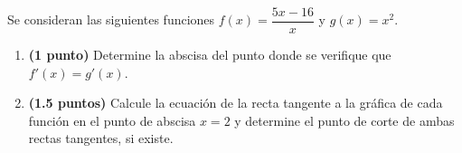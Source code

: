 
Se consideran las siguientes funciones $f(x)=\dfrac{5x-16}{x}$ y $g(x)=x^2$.
\begin{enumerate}[label=\alph*)]
\item \textbf{(1 punto)} Determine la abscisa del punto donde se verifique que $f'(x)=g'(x)$.
\item \textbf{(1.5 puntos)} Calcule la ecuación de la recta tangente a la gráfica de cada función en el punto de abscisa $x=2$ y determine el punto de corte de ambas rectas tangentes, si existe.
\end{enumerate}
